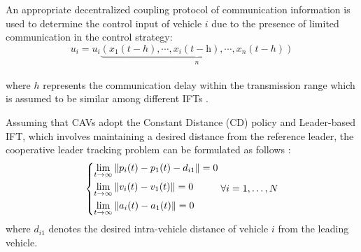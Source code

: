 \documentclass[a4paper]{cas-sc}
\begin{document}
An appropriate decentralized coupling protocol of communication information is used to determine the control input of vehicle $i$ due to the presence of limited communication in the control strategy:
\begin{equation}
  {u_i} = {u_i}\underbrace {\left( {{x_1}\left( {t - h} \right), \cdots ,{x_i}\left( {t - {\text{h}}} \right), \cdots ,{x_n}\left( {t - h} \right)} \right)}_n
  \label{eq7}
\end{equation}\\
where $h$ represents the communication delay within the transmission range which is assumed to be similar among different IFTs \citep{Zheng2015,Vukadinovic2018,Vu2020,Martin-Sacristan2020,Pirani2022}.

Assuming that CAVs adopt the Constant Distance (CD) policy and Leader-based IFT, which involves maintaining a desired distance from the reference leader, the cooperative leader tracking problem can be formulated as follows \citep{wang2018review}:
\begin{equation}
  \left\{ \begin{gathered}
    \mathop {\lim }\limits_{t \to \infty } \left\| {{p_i}(t) - {p_1}(t) - {d_{i1}}} \right\| = 0 \hfill \\
    \mathop {\lim }\limits_{t \to \infty } \left\| {{v_i}(t) - {v_1}(t)} \right\| = 0 \hfill \\
    \mathop {\lim }\limits_{t \to \infty } \left\| {{a_i}(t) - {a_1}(t)} \right\| = 0 \hfill \\
  \end{gathered}  \right.\forall i = 1, \ldots ,N
  \label{eq8}
\end{equation}
where $d_{i1}$ denotes the desired intra-vehicle distance of vehicle $i$ from the leading vehicle.
\end{document}
